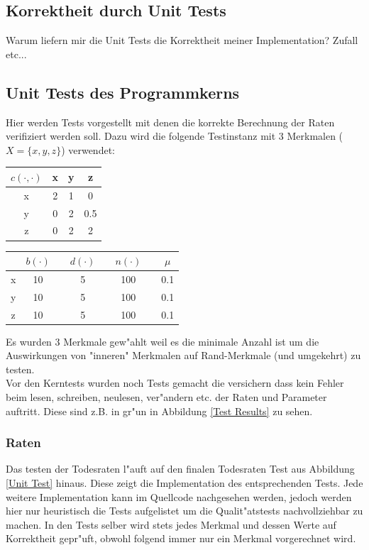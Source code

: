 \documentclass[11pt, a4paper, german]{article}
\theoremstyle{plain}
\begin{document}
	\subsection{Korrektheit durch Unit Tests}
	Warum liefern mir die Unit Tests die Korrektheit meiner Implementation? Zufall etc...

	\subsection{Unit Tests des Programmkerns}
	Hier werden Tests vorgestellt mit denen die korrekte Berechnung der Raten verifiziert werden soll. Dazu wird die folgende Testinstanz mit 3 Merkmalen ($ X = \{x,y,z\} $) verwendet:\\
	\begin{center}
		\begin{minipage}{0.35 \textwidth}
			\begin{tabular}{ c | c c c }
			 $ c(\cdot, \cdot) $ & x & y & z \\
			 \hline
			 x & 2 & 1 & 0 \\
			 y & 0 & 2 & 0.5 \\
			 z & 0 & 2 & 2 \\
			\end{tabular}
			\end{minipage}
			\begin{minipage}{0.5 \textwidth}
			\begin{tabular}{ c | c  c  c  c  c  c  c }
			 & $ b(\cdot ) $ &  & $ d(\cdot ) $ & & $ n(\cdot ) $ & & $ \mu $\\
			 \hline
			 x & 10 &  & 5 & & 100 & & 0.1\\
			 y & 10 &  & 5 & & 100 & & 0.1\\   
			 z & 10 &  & 5 & & 100 & & 0.1\\
			\end{tabular}
			\end{minipage}
	\end{center}
	Es wurden 3 Merkmale gew"ahlt weil es die minimale Anzahl ist um die Auswirkungen von "{}inneren"{} Merkmalen auf Rand-Merkmale (und umgekehrt) zu testen.\\
	Vor den Kerntests wurden noch Tests gemacht die versichern dass kein Fehler beim lesen, schreiben, neulesen, ver"andern etc. der Raten und Parameter auftritt. Diese sind z.B. in gr"un in Abbildung \ref{Test Results} zu sehen.

	\subsubsection{Raten}
	Das testen der Todesraten l"auft auf den finalen Todesraten Test aus Abbildung \ref{Unit Test} hinaus. Diese zeigt die Implementation des entsprechenden Tests. Jede weitere Implementation kann im Quellcode nachgesehen werden, jedoch werden hier nur heuristisch die Tests aufgelistet um die Qualit"atstests nachvollziehbar zu machen. In den Tests selber wird stets jedes Merkmal und dessen Werte auf Korrektheit gepr"uft, obwohl folgend immer nur ein Merkmal vorgerechnet wird.\\
	
\end{document}
